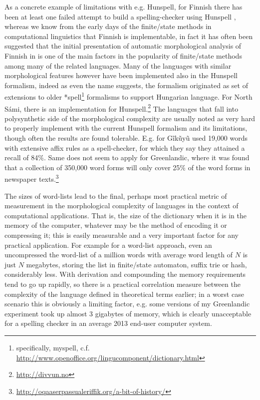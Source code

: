 \documentclass[officiallayout]{unihelcompling}
\begin{document}
As a concrete example of limitations with e.g. Hunspell, for Finnish there has
been at least one failed attempt to build a spelling-checker using Hunspell
\citep{pitkanen2006hunspell}, whereas we know from the early days of the
finite\-/state methods in computational linguistics that Finnish is
implementable, in fact it has often been suggested that the initial
presentation of automatic morphological analysis of Finnish in
\citet{koskenniemi1983twolevel} is one of the main factors in the popularity of
finite\-/state methods among many of the related languages. Many of the
languages with similar morphological features however have been implemented
also in the Hunspell formalism, indeed as even the name suggests, the formalism
originated as set of extensions to older *spell\footnote{specifically, 
    myspell, c.f.
\url{http://www.openoffice.org/lingucomponent/dictionary.html}} formalisms to
support Hungarian language.  For North Sámi, there is an implementation for
Hunspell.\footnote{\url{http://divvun.no}} The languages that fall into polysynthetic side of the morphological
complexity are usually noted as very hard to properly implement with the
current Hunspell formalism and its limitations, though often the results are
found tolerable. E.g. for Gĩkũyũ \citet{chege2010developing} used 19,000 words
with extensive affix rules as a spell-checker, for which they say they attained
a recall of 84\%. Same does not seem to apply for Greenlandic, where it was
found that a collection of 350,000 word forms will only cover 25\% of the
word forms in newspaper
texts.\footnote{\url{http://oqaaserpassualeriffik.org/a-bit-of-history/}}

The sizes of word-lists lead to the final, perhaps most practical metric of
measurement in the morphological complexity of languages in the context of
computational applications. That is, the size of the dictionary when it is in
the memory of the computer, whatever may be the method of encoding it or
compressing it; this is easily measurable and a very important factor for any
practical application.  For example for a word-list approach, even an
uncompressed the word-list of a million words with average word length of $N$
is just $N$ megabytes, storing the list in finite\-/state automaton, suffix trie
or hash, considerably less. With derivation and compounding the memory
requirements tend to go up rapidly, so there is a practical correlation measure
between the complexity of the language defined in theoretical terms earlier; in
a worst case scenario this is obviously a limiting factor, e.g. some versions
of my Greenlandic experiment took up almost 3 gigabytes of memory, which is
clearly unacceptable for a spelling checker in an average 2013 end-user
computer system.
\end{document}
